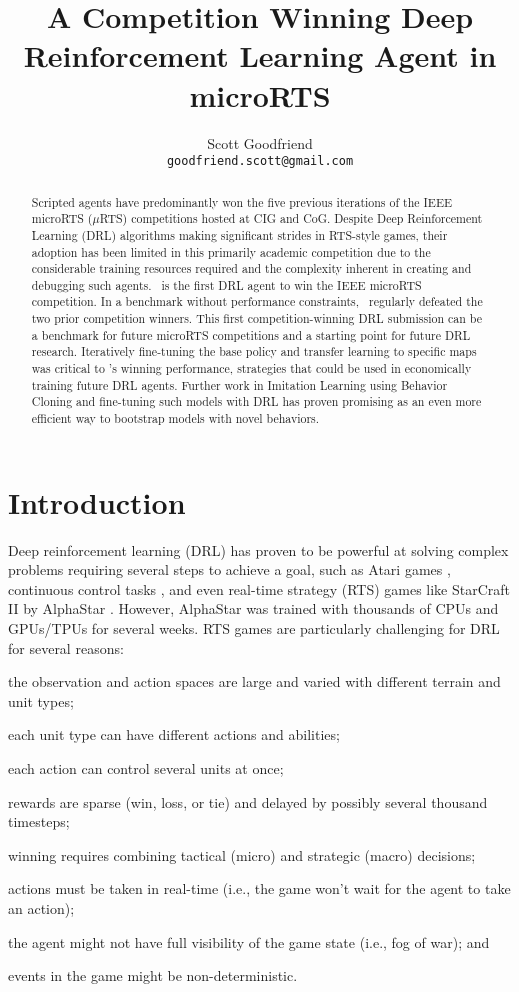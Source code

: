 \documentclass{article}
\title{A Competition Winning Deep Reinforcement Learning Agent in microRTS}
\author{Scott Goodfriend \\
\texttt{goodfriend.scott@gmail.com} \\
}
\begin{document}
\maketitle
\begin{abstract}
    Scripted agents have predominantly won the five
    previous iterations of the IEEE microRTS ($\mu$RTS) competitions hosted at CIG and
    CoG. Despite Deep Reinforcement Learning (DRL) algorithms making significant strides
    in RTS-style games, their adoption has been limited in this primarily academic
    competition due to the considerable training resources required and the complexity
    inherent in creating and debugging such agents. \agentName\ is the first DRL agent
    to win the IEEE microRTS competition. In a benchmark without performance
    constraints, \agentName\ regularly defeated the two
    prior competition winners. This first competition-winning DRL submission can be
    a benchmark for future microRTS competitions and a starting point for future DRL
    research. Iteratively fine-tuning the base policy and transfer learning to specific maps was 
    critical to \agentName's winning performance, strategies that could be used in
    economically training future DRL agents. Further work in Imitation Learning using Behavior Cloning and
    fine-tuning such models with DRL has proven promising as an even more efficient way
    to bootstrap models with novel behaviors.
\end{abstract}
\section{Introduction}
Deep reinforcement learning (DRL) has proven to be powerful at solving complex
problems requiring several steps to achieve a goal, such as Atari games \citep{DBLP:journals/corr/MnihKSGAWR13}, continuous
control tasks \citep{DBLP:journals/corr/LillicrapHPHETS15}, and even real-time strategy
(RTS) games like StarCraft II by AlphaStar \citep{Vinyals2019GrandmasterLI}. However, AlphaStar was trained with thousands of
CPUs and GPUs/TPUs for several weeks. RTS games are particularly challenging for DRL for
several reasons:
\begin{inparaenum}[(1)]
    \item the observation and action spaces are large and varied with different terrain and
        unit types;
    \item each unit type can have different actions and abilities;
    \item each action can control several units at once;
    \item rewards are sparse (win, loss, or tie) and delayed by possibly several
    thousand timesteps;
    \item winning requires combining tactical (micro) and strategic (macro) decisions;
    \item actions must be taken in real-time (i.e., the game won't wait for the agent to
        take an action);
    \item the agent might not have full visibility of the game state (i.e., fog of war); and
    \item events in the game might be non-deterministic.
\end{inparaenum}
\end{document}
